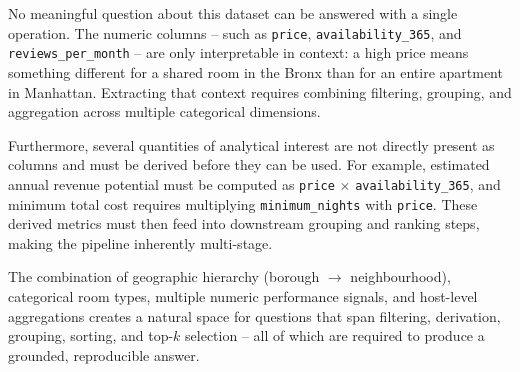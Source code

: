 
No meaningful question about this dataset can be answered with a single operation.
The numeric columns -- such as \texttt{price}, \texttt{availability\_365}, and \texttt{reviews\_per\_month} -- are only interpretable in context: a high price means something different for a shared room in the Bronx than for an entire apartment in Manhattan. Extracting that context requires combining filtering, grouping, and aggregation across multiple categorical dimensions.

Furthermore, several quantities of analytical interest are not directly present as columns and must be derived before they can be used.
For example, estimated annual revenue potential must be computed as \texttt{price} \texorpdfstring{$\times$}{times} \texttt{availability\_365}, and minimum total cost requires multiplying \texttt{minimum\_nights} with \texttt{price}. These derived metrics must then feed into downstream grouping and ranking steps, making the pipeline inherently multi-stage.

The combination of geographic hierarchy (borough $\rightarrow$ neighbourhood), categorical room types, multiple numeric performance signals, and host-level aggregations creates a natural space for questions that span filtering, derivation, grouping, sorting, and top-$k$ selection -- all of which are required to produce a grounded, reproducible answer.

